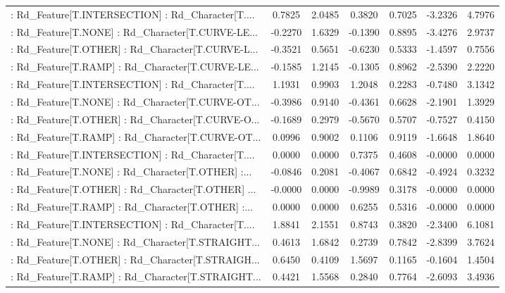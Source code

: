 \begin{longtable}{p{4cm}cccccc}
 : Rd\_Feature[T.INTERSECTION] : Rd\_Character[T.... &  0.7825 &    2.0485 &  0.3820 &       0.7025 & -3.2326 &  4.7976 \\
 : Rd\_Feature[T.NONE] : Rd\_Character[T.CURVE-LE... & -0.2270 &    1.6329 & -0.1390 &       0.8895 & -3.4276 &  2.9737 \\
 : Rd\_Feature[T.OTHER] : Rd\_Character[T.CURVE-L... & -0.3521 &    0.5651 & -0.6230 &       0.5333 & -1.4597 &  0.7556 \\
 : Rd\_Feature[T.RAMP] : Rd\_Character[T.CURVE-LE... & -0.1585 &    1.2145 & -0.1305 &       0.8962 & -2.5390 &  2.2220 \\
 : Rd\_Feature[T.INTERSECTION] : Rd\_Character[T.... &  1.1931 &    0.9903 &  1.2048 &       0.2283 & -0.7480 &  3.1342 \\
 : Rd\_Feature[T.NONE] : Rd\_Character[T.CURVE-OT... & -0.3986 &    0.9140 & -0.4361 &       0.6628 & -2.1901 &  1.3929 \\
 : Rd\_Feature[T.OTHER] : Rd\_Character[T.CURVE-O... & -0.1689 &    0.2979 & -0.5670 &       0.5707 & -0.7527 &  0.4150 \\
 : Rd\_Feature[T.RAMP] : Rd\_Character[T.CURVE-OT... &  0.0996 &    0.9002 &  0.1106 &       0.9119 & -1.6648 &  1.8640 \\
 : Rd\_Feature[T.INTERSECTION] : Rd\_Character[T.... &  0.0000 &    0.0000 &  0.7375 &       0.4608 & -0.0000 &  0.0000 \\
 : Rd\_Feature[T.NONE] : Rd\_Character[T.OTHER] :... & -0.0846 &    0.2081 & -0.4067 &       0.6842 & -0.4924 &  0.3232 \\
 : Rd\_Feature[T.OTHER] : Rd\_Character[T.OTHER] ... & -0.0000 &    0.0000 & -0.9989 &       0.3178 & -0.0000 &  0.0000 \\
 : Rd\_Feature[T.RAMP] : Rd\_Character[T.OTHER] :... &  0.0000 &    0.0000 &  0.6255 &       0.5316 & -0.0000 &  0.0000 \\
 : Rd\_Feature[T.INTERSECTION] : Rd\_Character[T.... &  1.8841 &    2.1551 &  0.8743 &       0.3820 & -2.3400 &  6.1081 \\
 : Rd\_Feature[T.NONE] : Rd\_Character[T.STRAIGHT... &  0.4613 &    1.6842 &  0.2739 &       0.7842 & -2.8399 &  3.7624 \\
 : Rd\_Feature[T.OTHER] : Rd\_Character[T.STRAIGH... &  0.6450 &    0.4109 &  1.5697 &       0.1165 & -0.1604 &  1.4504 \\
 : Rd\_Feature[T.RAMP] : Rd\_Character[T.STRAIGHT... &  0.4421 &    1.5568 &  0.2840 &       0.7764 & -2.6093 &  3.4936 \\

\end{longtable}
